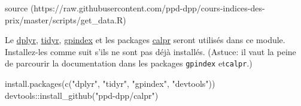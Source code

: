 \documentclass[
]{article}
\newenvironment{Shaded}{\begin{snugshade}}{\end{snugshade}}
\newcommand{\FunctionTok}[1]{\textcolor[rgb]{0.00,0.00,0.00}{#1}}
\newcommand{\NormalTok}[1]{#1}
\newcommand{\SpecialCharTok}[1]{\textcolor[rgb]{0.00,0.00,0.00}{#1}}
\newcommand{\StringTok}[1]{\textcolor[rgb]{0.31,0.60,0.02}{#1}}
\begin{document}
\begin{Shaded}
\begin{Highlighting}[]
\FunctionTok{source}\NormalTok{ (}\StringTok{\textquotesingle{}https://raw.githubusercontent.com/ppd{-}dpp/cours{-}indices{-}des{-}prix/master/scripts/get\_data.R\textquotesingle{}}\NormalTok{)}
\end{Highlighting}
\end{Shaded}

Le \href{https://cran.r-project.org/package=dplyr}{dplyr}, \href{https://cran.r-project.org/package=tidyr}{tidyr}, \href{https:\%20/\%20/cran.r-project.org/package=gpindex}{gpindex} et les packages \href{https://github.com/ppd-dpp/calpr}{calpr} seront utilisés dans ce module. Installez-les comme suit s'ils ne sont pas déjà installés. (Astuce: il vaut la peine de parcourir la documentation dans les packages \texttt{gpindex} et\texttt{calpr}.)

\begin{Shaded}
\begin{Highlighting}[]
\FunctionTok{install.packages}\NormalTok{(}\FunctionTok{c}\NormalTok{(}\StringTok{"dplyr"}\NormalTok{, }\StringTok{"tidyr"}\NormalTok{, }\StringTok{"gpindex"}\NormalTok{, }\StringTok{"devtools"}\NormalTok{))}
\NormalTok{devtools}\SpecialCharTok{::}\FunctionTok{install\_github}\NormalTok{(}\StringTok{"ppd{-}dpp/calpr"}\NormalTok{)}
\end{Highlighting}
\end{Shaded}
\end{document}

